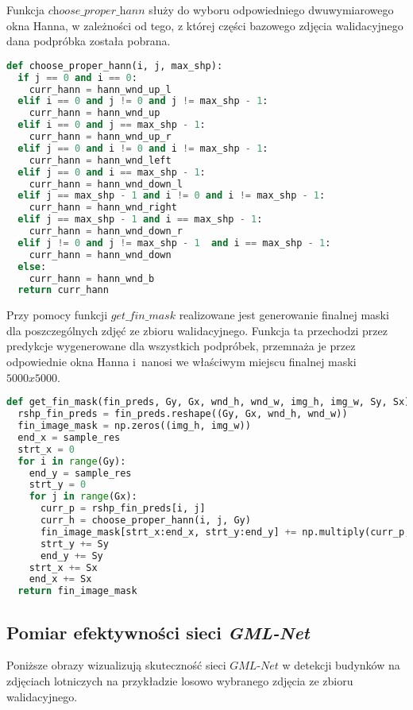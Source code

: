 \cell
Funkcja $\textit{choose$\_$proper$\_$hann}$ służy do wyboru odpowiedniego dwuwymiarowego okna Hanna, w zależności od tego, z której części bazowego zdjęcia walidacyjnego dana podpróbka została pobrana.

\cell
\begin{lstlisting}[name=Rozdzial3.1, language=Python]
def choose_proper_hann(i, j, max_shp):
  if j == 0 and i == 0:
    curr_hann = hann_wnd_up_l
  elif i == 0 and j != 0 and j != max_shp - 1:
    curr_hann = hann_wnd_up
  elif i == 0 and j == max_shp - 1:
    curr_hann = hann_wnd_up_r
  elif j == 0 and i != 0 and i != max_shp - 1:
    curr_hann = hann_wnd_left
  elif j == 0 and i == max_shp - 1:
    curr_hann = hann_wnd_down_l
  elif j == max_shp - 1 and i != 0 and i != max_shp - 1:
    curr_hann = hann_wnd_right
  elif j == max_shp - 1 and i == max_shp - 1:
    curr_hann = hann_wnd_down_r
  elif j != 0 and j != max_shp - 1  and i == max_shp - 1:
    curr_hann = hann_wnd_down
  else:
    curr_hann = hann_wnd_b
  return curr_hann
\end{lstlisting}


\cell
Przy pomocy funkcji $\textit{get$\_$fin$\_$mask}$ realizowane jest generowanie finalnej maski dla poszczególnych zdjęć ze zbioru walidacyjnego. Funkcja ta przechodzi przez predykcje wygenerowane dla wszystkich podpróbek, przemnaża je przez odpowiednie okna Hanna i~nanosi we właściwym miejscu finalnej maski $\textit{5000x5000}$. 

\cell
\begin{lstlisting}[name=Rozdzial3.1, language=Python]
def get_fin_mask(fin_preds, Gy, Gx, wnd_h, wnd_w, img_h, img_w, Sy, Sx):
  rshp_fin_preds = fin_preds.reshape((Gy, Gx, wnd_h, wnd_w))
  fin_image_mask = np.zeros((img_h, img_w))
  end_x = sample_res
  strt_x = 0
  for i in range(Gy):
    end_y = sample_res
    strt_y = 0
    for j in range(Gx):
      curr_p = rshp_fin_preds[i, j]
      curr_h = choose_proper_hann(i, j, Gy)
      fin_image_mask[strt_x:end_x, strt_y:end_y] += np.multiply(curr_p, curr_h)
      strt_y += Sy
      end_y += Sy
    strt_x += Sx
    end_x += Sx
  return fin_image_mask
\end{lstlisting}

\subsection{Pomiar efektywności sieci \emph{GML-Net}}

\cell
Poniższe obrazy wizualizują skuteczność sieci $\textit{GML-Net}$ w detekcji budynków na zdjęciach lotniczych na przykładzie losowo wybranego zdjęcia ze zbioru walidacyjnego.

